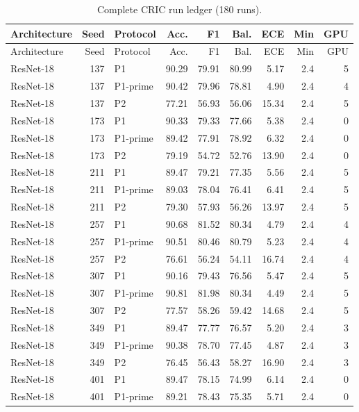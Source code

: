 {\scriptsize
\setlength{\tabcolsep}{3.5pt}
\begin{longtable}{lrlrrrrrr}
\caption{Complete CRIC run ledger (180 runs).}\label{r:tab:ledger-cric}\\
\toprule
Architecture & Seed & Protocol & Acc. & F1 & Bal. & ECE & Min & GPU \\
\midrule
\endfirsthead
\toprule
Architecture & Seed & Protocol & Acc. & F1 & Bal. & ECE & Min & GPU \\
\midrule
\endhead
\bottomrule
\endfoot
ResNet-18 & 137 & P1 & 90.29 & 79.91 & 80.99 & 5.17 & 2.4 & 5 \\
ResNet-18 & 137 & P1-prime & 90.42 & 79.96 & 78.81 & 4.90 & 2.4 & 4 \\
ResNet-18 & 137 & P2 & 77.21 & 56.93 & 56.06 & 15.34 & 2.4 & 5 \\
ResNet-18 & 173 & P1 & 90.33 & 79.33 & 77.66 & 5.38 & 2.4 & 0 \\
ResNet-18 & 173 & P1-prime & 89.42 & 77.91 & 78.92 & 6.32 & 2.4 & 0 \\
ResNet-18 & 173 & P2 & 79.19 & 54.72 & 52.76 & 13.90 & 2.4 & 0 \\
ResNet-18 & 211 & P1 & 89.47 & 79.21 & 77.35 & 5.56 & 2.4 & 5 \\
ResNet-18 & 211 & P1-prime & 89.03 & 78.04 & 76.41 & 6.41 & 2.4 & 5 \\
ResNet-18 & 211 & P2 & 79.30 & 57.93 & 56.26 & 13.97 & 2.4 & 5 \\
ResNet-18 & 257 & P1 & 90.68 & 81.52 & 80.34 & 4.79 & 2.4 & 4 \\
ResNet-18 & 257 & P1-prime & 90.51 & 80.46 & 80.79 & 5.23 & 2.4 & 4 \\
ResNet-18 & 257 & P2 & 76.61 & 56.24 & 54.11 & 16.74 & 2.4 & 4 \\
ResNet-18 & 307 & P1 & 90.16 & 79.43 & 76.56 & 5.47 & 2.4 & 5 \\
ResNet-18 & 307 & P1-prime & 90.81 & 81.98 & 80.34 & 4.49 & 2.4 & 5 \\
ResNet-18 & 307 & P2 & 77.57 & 58.26 & 59.42 & 14.68 & 2.4 & 5 \\
ResNet-18 & 349 & P1 & 89.47 & 77.77 & 76.57 & 5.20 & 2.4 & 3 \\
ResNet-18 & 349 & P1-prime & 90.38 & 78.70 & 77.45 & 4.87 & 2.4 & 3 \\
ResNet-18 & 349 & P2 & 76.45 & 56.43 & 58.27 & 16.90 & 2.4 & 3 \\
ResNet-18 & 401 & P1 & 89.47 & 78.15 & 74.99 & 6.14 & 2.4 & 0 \\
ResNet-18 & 401 & P1-prime & 89.21 & 78.43 & 75.35 & 5.71 & 2.4 & 0 \\

\end{longtable}}
